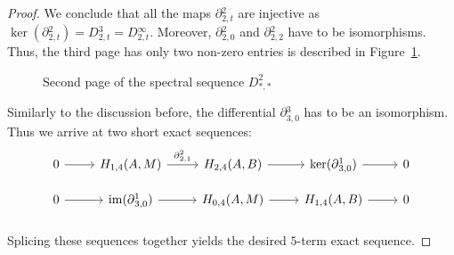 \documentclass[10pt,a4paper]{amsart}
\DeclareMathOperator{\coker}{coker}
\DeclareMathOperator{\im}{im}
\begin{document}
\begin{proof}
We conclude that all the maps ${\partial}{^2_{2,t}}$ are injective as $\ker ({\partial}{^2_{2,t}})={D}{^3_{2,t}}={D}{^\infty_{2,t}}$. Moreover, ${\partial}{^2_{2,0}}$ and ${\partial}{^2_{2,2}}$ have to be isomorphisms. Thus, the third page has only two non-zero entries is described in Figure~\ref{fig:ThirdPageOfD}.

    \begin{figure}[ht]
    \centering
        \caption{Second page of the spectral sequence $D^2_{*,*}$}
        \label{fig:ThirdPageOfD}
    \end{figure}
Similarly to the discussion before, the differential ${\partial}{^3_{3,0}}$ has to be an isomorphism. Thus we arrive at two short exact sequences:
\begin{equation*}
    \begin{tikzcd}[row sep=small]
        0\arrow[r]&H_{1,4}(A,M)\arrow[r,"{{\partial}{^2_{2,1}}}"] &H_{2,4}(A,B)\arrow[r]&\ker({\partial}{^1_{3,0}})\arrow[r]&0\\
        0\arrow[r]&\im({\partial}{^1_{3,0}})\arrow[r] &H_{0,4}(A,M)\arrow[r]&H_{1,4}(A,B)\arrow[r]&0\\
    \end{tikzcd}
\end{equation*}
Splicing these sequences together yields the desired $5$-term exact sequence.
\end{proof}
\end{document}

